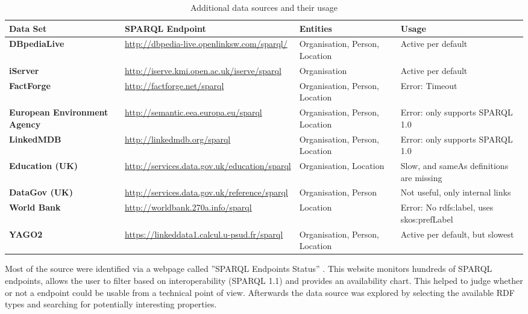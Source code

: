 \begin{table}[H]
	\begin{tabular*}{\textwidth}{p{}|p{}|p{} |p{3cm}}
		
		\textbf{Data Set} &\small \textbf{SPARQL Endpoint} & \textbf{Entities} & \textbf{Usage}  \\
		\hline 
		\textbf{DBpediaLive} &\small \url{http://dbpedia-live.openlinksw.com/sparql/} & Organisation, Person, Location  & Active per default\\
		\hline 
		\textbf{iServer} &\small \url{http://iserve.kmi.open.ac.uk/iserve/sparql} & Organisation & Active per default \\
		\hline 
		\textbf{FactForge} &\small \url{http://factforge.net/sparql} & Organisation, Person, Location & Error: Timeout \\
		\hline 
		\textbf{European Environment Agency} &\small \url{http://semantic.eea.europa.eu/sparql} &  Organisation, Person, Location  & Error: only supports SPARQL 1.0  \\
		\hline   
		\textbf{LinkedMDB} &\small \url{http://linkedmdb.org/sparql} &  Organisation, Person, Location  & Error: only supports SPARQL 1.0 \\
		\hline 
		\textbf{Education (UK)} & \small \url{http://services.data.gov.uk/education/sparql} &  Organisation, Location  & Slow, and sameAs definitions are missing \\
		\hline 
		\textbf{DataGov (UK)} &\small \url{http://services.data.gov.uk/reference/sparql} &  Organisation, Person  & Not useful, only internal links\\
		\hline 
		\textbf{World Bank} &\small \url{http://worldbank.270a.info/sparql} &  Location & Error: No rdfs:label, uses skos:prefLabel \\
		\hline 
		\textbf{YAGO2} &\small \url{https://linkeddata1.calcul.u-psud.fr/sparql} &  Organisation, Person, Location & Active per default, but slowest \\
	\end{tabular*}
	\caption{Additional data sources and their usage}
	\label{tab:sources}
\end{table}

Most of the source were identified via a webpage called ''SPARQL Endpoints Status'' \cite{pierre-yves_vandenbussche_sparql_2013}. This website monitors hundreds of SPARQL endpoints, allows the user to filter based on interoperability (SPARQL 1.1) and provides an availability chart. This helped to judge whether or not a endpoint could be usable from a technical point of view. Afterwards the data source was explored by selecting the available RDF types and searching for potentially interesting properties. 















